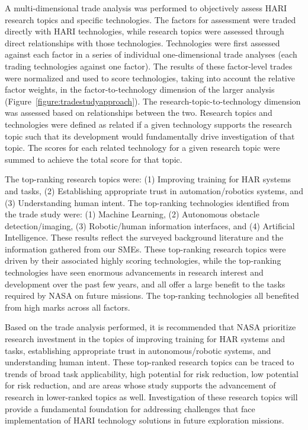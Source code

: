 A multi-dimensional trade analysis was performed to objectively assess HARI research topics and specific technologies.
The factors for assessment were traded directly with HARI technologies, while research topics were assessed through direct relationships with those technologies.
Technologies were first assessed against each factor in a series of individual one-dimensional trade analyses (each trading technologies against one factor).
The results of these factor-level trades were normalized and used to score technologies, taking into account the relative factor weights, in the factor-to-technology dimension of the larger analysis (Figure~\ref{figure:tradestudyapproach}).
The research-topic-to-technology dimension was assessed based on relationships between the two.
Research topics and technologies were defined as related if a given technology supports the research topic such that its development would fundamentally drive investigation of that topic.
The scores for each related technology for a given research topic were summed to achieve the total score for that topic.

The top-ranking research topics were: (1) Improving training for HAR systems and tasks, (2) Establishing appropriate trust in automation/robotics systems, and (3) Understanding human intent.
The top-ranking technologies identified from the trade study were: (1) Machine Learning, (2) Autonomous obstacle detection/imaging, (3) Robotic/human information interfaces, and (4) Artificial Intelligence.
These results reflect the surveyed background literature and the information gathered from our SMEs.
These top-ranking research topics were driven by their associated highly scoring technologies, while the top-ranking technologies have seen enormous advancements in research interest and development over the past few years, and all offer a large benefit to the tasks required by NASA on future missions.
The top-ranking technologies all benefited from high marks across all factors.

Based on the trade analysis performed, it is recommended that NASA prioritize research investment in the topics of improving training for HAR systems and tasks, establishing appropriate trust in autonomous/robotic systems, and understanding human intent.
These top-ranked research topics can be traced to trends of broad task applicability, high potential for risk reduction, low potential for risk reduction, and are areas whose study supports the advancement of research in lower-ranked topics as well.
Investigation of these research topics will provide a fundamental foundation for addressing challenges that face implementation of HARI technology solutions in future exploration missions.

